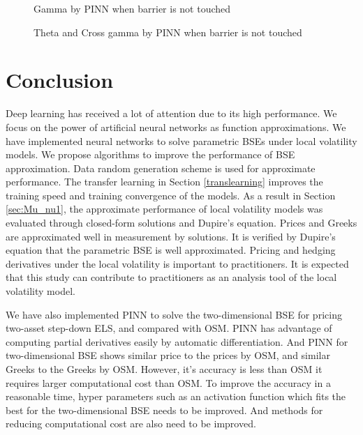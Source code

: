 \documentclass[11pt,reqno]{article}
\numberwithin{equation}{section}
\begin{document}
{\begin{figure}[H]
\centering
    \caption{Gamma by PINN when barrier is not touched}
    \label{fig:gamma PINN}
\end{figure}

\begin{figure}[H]
\centering
    \caption{Theta and Cross gamma by PINN when barrier is not touched}  
    \label{fig:theta and crossgamma PINN}
\end{figure}


\section{Conclusion}

Deep learning has received a lot of attention due to its high performance.
 We focus on the power of artificial neural networks as function approximations.
  We have implemented neural networks to solve parametric BSEs under local volatility models.
   We propose algorithms to improve the performance of BSE approximation.
    Data random generation scheme is used for approximate performance. 
The transfer learning in Section \ref{translearning} improves the training speed 
and training convergence of the models.
 As a result in Section \ref{sec:Mu_nu1}, the approximate performance of local volatility models 
 was evaluated through closed-form solutions and Dupire's equation.
  Prices and Greeks are approximated well in measurement by solutions.
   It is verified by Dupire's equation that the parametric BSE is well approximated.
    Pricing and hedging derivatives under the local volatility is important to practitioners.
It is expected that this study can contribute to practitioners as an analysis tool of the local volatility model. 

We have also implemented PINN to solve the two-dimensional BSE for pricing two-asset step-down ELS,
 and compared with OSM.
PINN has advantage of computing partial derivatives easily by automatic differentiation.
 And PINN for two-dimensional BSE shows similar price to the prices by OSM,
  and similar Greeks to the Greeks by OSM.
   However, it's accuracy is less than OSM it requires larger computational cost than OSM.
    To improve the accuracy in a reasonable time, hyper parameters such as an activation function
     which fits the best for the two-dimensional BSE needs to be improved.
And methods for reducing computational cost are also need to be improved.

}
\end{document}
